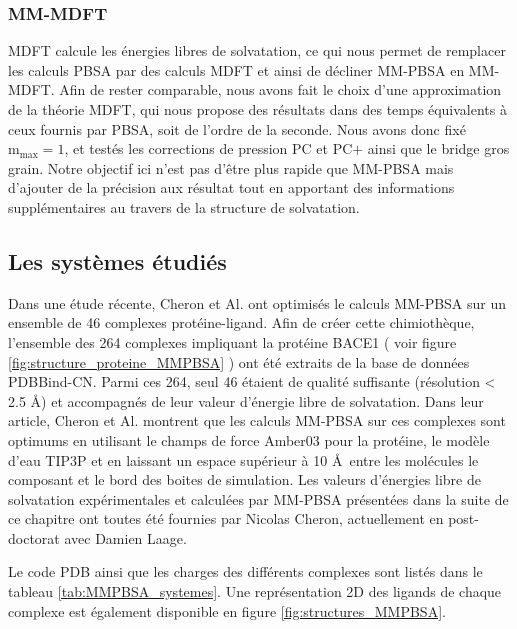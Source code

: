 \subsubsection{MM-MDFT}
MDFT calcule les énergies libres de solvatation, ce qui nous permet de remplacer les calculs PBSA par des calculs MDFT et ainsi de décliner MM-PBSA en MM-MDFT. Afin de rester comparable, nous avons fait le choix d'une approximation de la théorie MDFT, qui nous propose des résultats dans des temps équivalents à ceux fournis par PBSA, soit de l'ordre de la seconde. Nous avons donc fixé $\mathrm{m}_\mathrm{max}=1$, et testés les corrections de pression PC et PC+ ainsi que le bridge gros grain. Notre objectif ici n'est pas d'être plus rapide que MM-PBSA mais d'ajouter de la précision aux résultat tout en apportant des informations supplémentaires au travers de la structure de solvatation. 


\subsection{Les systèmes étudiés}
Dans une étude récente, Cheron et Al.\cite{cheron_effect_2017} ont optimisés le calculs MM-PBSA sur un ensemble de 46 complexes protéine-ligand. Afin de créer cette chimiothèque, l'ensemble des 264 complexes impliquant la protéine BACE1 ( voir figure \ref{fig:structure_proteine_MMPBSA} ) ont été extraits de la base de données PDBBind-CN. Parmi ces 264, seul 46 étaient de qualité suffisante (résolution < 2.5 \AA) et accompagnés de leur valeur d'énergie libre de solvatation. Dans leur article, Cheron et Al. montrent que les calculs MM-PBSA sur ces complexes sont optimums en utilisant le champs de force Amber03 pour la protéine, le modèle d'eau TIP3P et en laissant un espace supérieur à 10 \AA\ entre les molécules le composant et le bord des boites de simulation. Les valeurs d'énergies libre de solvatation expérimentales et calculées par MM-PBSA présentées dans la suite de ce chapitre ont toutes été fournies par Nicolas Cheron, actuellement en post-doctorat avec Damien Laage.

Le code PDB ainsi que les charges des différents complexes sont listés dans le tableau \ref{tab:MMPBSA_systemes}. Une représentation 2D des ligands de chaque complexe est également disponible en figure \ref{fig:structures_MMPBSA}.








